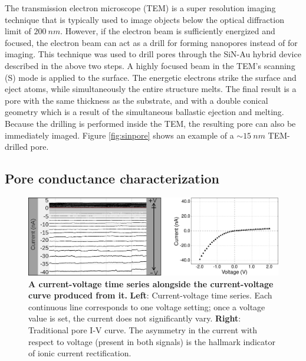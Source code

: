 		
			The transmission electron microscope (TEM) is a super resolution imaging technique that is typically used to image objects below the optical diffraction limit of $\SI{200}{nm}$. However, if the electron beam is sufficiently energized and focused, the electron beam can act as a drill for forming nanopores instead of for imaging. This technique was used to drill pores through the SiN-Au hybrid device described in the above two steps. A highly focused beam in the TEM's scanning (S) mode is applied to the surface. The energetic electrons strike the surface and eject atoms, while simultaneously the entire structure melts. The final result is a pore with the same thickness as the substrate, and with a double conical geometry which is a result of the simultaneous ballastic ejection and melting. Because the drilling is performed inside the TEM, the resulting pore can also be immediately imaged. Figure \ref{fig:sinpore} shows an example of a $\sim\SI{15}{nm}$ TEM-drilled pore.
			
		\subsection{Pore conductance characterization}
		
			\begin{figure}
				\includegraphics[width=\textwidth]{siniv.png}
				\caption{\textbf{A current-voltage time series alongside the current-voltage curve produced from it.} \textbf{Left}: Current-voltage time series. Each continuous line corresponds to one voltage setting; once a voltage value is set, the current does not significantly vary. \textbf{Right}: Traditional pore I-V curve. The asymmetry in the current with respect to voltage (present in both signals) is the hallmark indicator of ionic current rectification.}
				\label{fig:siniv}
			\end{figure}

